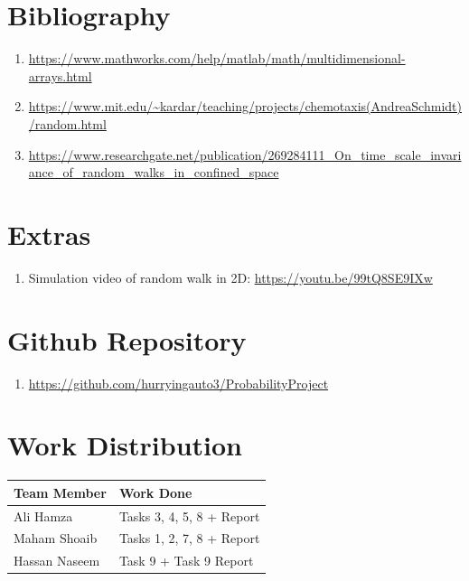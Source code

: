 \documentclass{article}
\begin{document}
\newpage
\section{Bibliography}

\begin{enumerate}
    \item \url{https://www.mathworks.com/help/matlab/math/multidimensional-arrays.html}
    \item \url{https://www.mit.edu/~kardar/teaching/projects/chemotaxis(AndreaSchmidt)/random.html}
    \item \url{https://www.researchgate.net/publication/269284111_On_time_scale_invariance_of_random_walks_in_confined_space}
\end{enumerate}

\section{Extras}
\begin{enumerate}
    \item Simulation video of random walk in 2D: \url{https://youtu.be/99tQ8SE9IXw}
\end{enumerate}

\section{Github Repository}
\begin{enumerate}
    \item \url{https://github.com/hurryingauto3/ProbabilityProject}
\end{enumerate}
\section{Work Distribution}

\begin{table}[h]

    \begin{tabular}{|l|l|}
    \hline
    \rowcolor[HTML]{C0C0C0} 
    {\color[HTML]{333333} \textbf{Team Member}} & {\color[HTML]{333333} \textbf{Work Done}} \\ \hline
    Ali Hamza     & Tasks 3, 4, 5, 8 + Report  \\ \hline
    Maham Shoaib  & Tasks 1, 2, 7, 8  + Report \\ \hline
    Hassan Naseem & Task 9 + Task 9 Report     \\ \hline
    \end{tabular}%
    \end{table}
\end{document}
